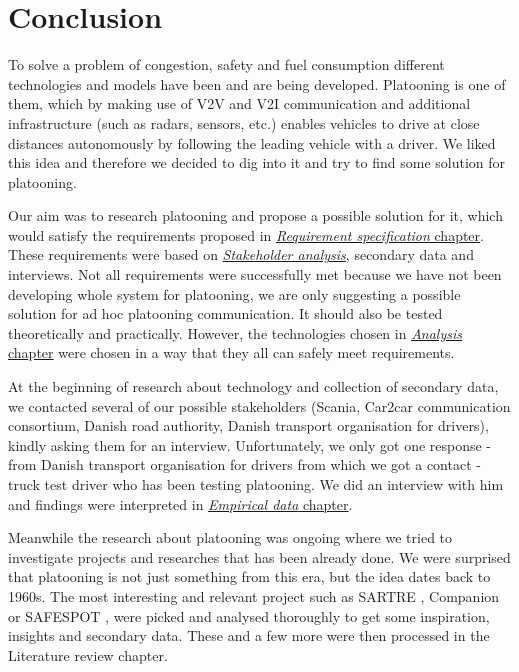 \section{Conclusion}\label{sec:conclusion}
%
To solve a problem of congestion, safety and fuel consumption different technologies and models have been and are being developed. Platooning is one of them, which by making use of V2V and V2I communication and additional infrastructure (such as radars, sensors, etc.) enables vehicles to drive at close distances autonomously by following the leading vehicle with a driver. We liked this idea and therefore we decided to dig into it and try to find some solution for platooning.\par
%
Our aim was to research platooning and propose a possible solution for it, which would satisfy the requirements proposed in \hyperref[sec:requirements]{\textit{Requirement specification} chapter}. These requirements were based on \hyperref[sec:stakeholders]{\textit{Stakeholder analysis}}, secondary data and interviews. Not all requirements were successfully met because we have not been developing whole system for platooning, we are only suggesting a possible solution for ad hoc platooning communication. It should also be tested theoretically and practically. However, the technologies chosen in \hyperref[sec:analysis]{\textit{Analysis} chapter} were chosen in a way that they all can safely meet requirements.\par
%
At the beginning of research about technology and collection of secondary data, we contacted several of our possible stakeholders (Scania, Car2car communication consortium, Danish road authority, Danish transport organisation for drivers), kindly asking them for an interview. Unfortunately, we only got one response - from Danish transport organisation for drivers from which we got a contact - truck test driver who has been testing platooning. We did an interview with him and findings were interpreted in \hyperref[sec:data]{\textit{Empirical data} chapter}.\par
%
Meanwhile the research about platooning was ongoing where we tried to investigate projects and researches that has been already done. We were surprised that platooning is not just something from this era, but the idea dates back to 1960s. The most interesting and relevant project such as SARTRE \cite{Chan2012ProjectSARTRE}, Companion \cite{2016CompanionProject} or SAFESPOT \cite{Safespot}, were picked and analysed thoroughly to get some inspiration, insights and secondary data. These and a few more were then processed in the Literature review chapter.\par
